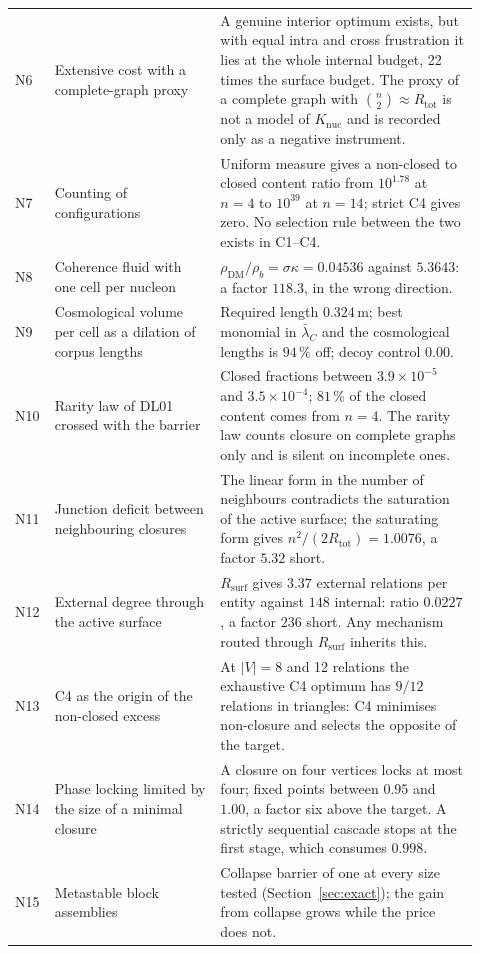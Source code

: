 \documentclass[11pt,a4paper]{article}
\theoremstyle{plain}
\theoremstyle{definition}
\theoremstyle{remark}
\begin{document}
\begin{small}
\begin{longtable}{>{\raggedright\arraybackslash}p{0.05\linewidth}>{\raggedright\arraybackslash}p{0.34\linewidth}>{\raggedright\arraybackslash}p{0.53\linewidth}}
N6 & Extensive cost with a complete-graph proxy & A genuine interior optimum exists, but with equal intra and cross frustration it lies at the whole internal budget, 22 times the surface budget. The proxy of a complete graph with $\binom{n}{2}\approx R_{\mathrm{tot}}$ is not a model of $K_{\mathrm{nuc}}$ and is recorded only as a negative instrument. \\
N7 & Counting of configurations & Uniform measure gives a non-closed to closed content ratio from $10^{1.78}$ at $n=4$ to $10^{39}$ at $n=14$; strict C4 gives zero. No selection rule between the two exists in C1--C4. \\
N8 & Coherence fluid with one cell per nucleon & $\rho_{\mathrm{DM}}/\rho_b=\sigma\kappa=0.04536$ against $5.3643$: a factor $118.3$, in the wrong direction. \\
N9 & Cosmological volume per cell as a dilation of corpus lengths & Required length $0.324\,\mathrm{m}$; best monomial in $\bar\lambda_C$ and the cosmological lengths is $94\,\%$ off; decoy control $0.00$. \\
N10 & Rarity law of DL01 crossed with the barrier & Closed fractions between $3.9\times10^{-5}$ and $3.5\times10^{-4}$; $81\,\%$ of the closed content comes from $n=4$. The rarity law counts closure on complete graphs only and is silent on incomplete ones. \\
N11 & Junction deficit between neighbouring closures & The linear form in the number of neighbours contradicts the saturation of the active surface; the saturating form gives $n^2/(2R_{\mathrm{tot}})=1.0076$, a factor $5.32$ short. \\
N12 & External degree through the active surface & $R_{\mathrm{surf}}$ gives $3.37$ external relations per entity against $148$ internal: ratio $0.0227$, a factor $236$ short. Any mechanism routed through $R_{\mathrm{surf}}$ inherits this. \\
N13 & C4 as the origin of the non-closed excess & At $|V|=8$ and 12 relations the exhaustive C4 optimum has $9/12$ relations in triangles: C4 minimises non-closure and selects the opposite of the target. \\
N14 & Phase locking limited by the size of a minimal closure & A closure on four vertices locks at most four; fixed points between $0.95$ and $1.00$, a factor six above the target. A strictly sequential cascade stops at the first stage, which consumes $0.998$. \\
N15 & Metastable block assemblies & Collapse barrier of one at every size tested (Section~\ref{sec:exact}); the gain from collapse grows while the price does not. \\

\end{longtable}
\end{small}
\end{document}
